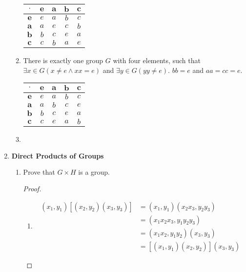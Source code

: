 \begin{enumerate}[label={\Alph*.},font={\bfseries}]
\begin{enumerate}[label={\arabic*},font={\bfseries}]
    \begin{tabular}{ c | c c c c }
      $\cdot$ & $\mathbf{e}$ & $\mathbf{a}$ & $\mathbf{b}$ & $\mathbf{c}$  \\
      \hline
      $\mathbf{e}$ & $e$ & $a$ & $b$ & $c$ \\
      $\mathbf{a}$ & $a$ & $e$ & $c$ & $b$ \\
      $\mathbf{b}$ & $b$ & $c$ & $e$ & $a$ \\
      $\mathbf{c}$ & $c$ & $b$ & $a$ & $e$
    \end{tabular}
  \item There is exactly one group $G$ with four elements, such that $\exists x \in G (x \ne e \land xx = e)$ and
    $\exists y \in G (yy \ne e)$. $bb = e$ and $aa = cc = e$.
    \begin{tabular}{ c | c c c c }
      $\cdot$ & $\mathbf{e}$ & $\mathbf{a}$ & $\mathbf{b}$ & $\mathbf{c}$  \\
      \hline
      $\mathbf{e}$ & $e$ & $a$ & $b$ & $c$ \\
      $\mathbf{a}$ & $a$ & $b$ & $c$ & $e$ \\
      $\mathbf{b}$ & $b$ & $c$ & $e$ & $a$ \\
      $\mathbf{c}$ & $c$ & $e$ & $a$ & $b$
    \end{tabular}
    \item {}
  \end{enumerate}
\item {\bf Direct Products of Groups}
  \begin{enumerate}[label={\arabic*},font={\bfseries}]
  \item Prove that $G \times H$ is a group.
    \begin{proof}
      \ \\
      \begin{enumerate}[label={(G\arabic*)}]
      \item
        \begin{align*}
          (x_1,y_1)\left[(x_2,y_2)(x_3,y_3)\right] &= (x_1,y_1)(x_2x_3,y_2y_3) \\
          &= (x_1x_2x_3,y_1y_2y_3) \\
          &= (x_1x_2,y_1y_2)(x_3,y_3) \\
          &= \left[(x_1,y_1)(x_2,y_2)\right](x_3,y_3)

\end{align*}
\end{enumerate}
\end{proof}
\end{enumerate}
\end{enumerate}
